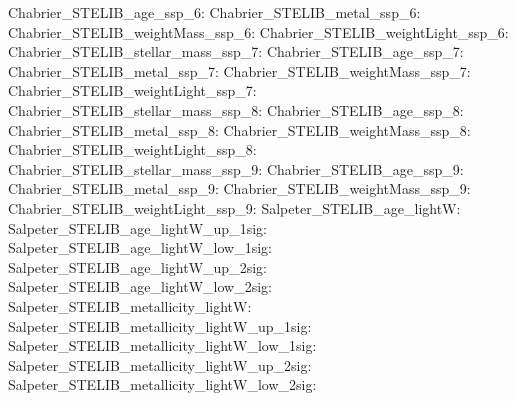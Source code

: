 Chabrier\_STELIB\_age\_ssp\_6:  \newline 
Chabrier\_STELIB\_metal\_ssp\_6:  \newline 
Chabrier\_STELIB\_weightMass\_ssp\_6:  \newline 
Chabrier\_STELIB\_weightLight\_ssp\_6:  \newline 
Chabrier\_STELIB\_stellar\_mass\_ssp\_7:  \newline 
Chabrier\_STELIB\_age\_ssp\_7:  \newline 
Chabrier\_STELIB\_metal\_ssp\_7:  \newline 
Chabrier\_STELIB\_weightMass\_ssp\_7:  \newline 
Chabrier\_STELIB\_weightLight\_ssp\_7:  \newline 
Chabrier\_STELIB\_stellar\_mass\_ssp\_8:  \newline 
Chabrier\_STELIB\_age\_ssp\_8:  \newline 
Chabrier\_STELIB\_metal\_ssp\_8:  \newline 
Chabrier\_STELIB\_weightMass\_ssp\_8:  \newline 
Chabrier\_STELIB\_weightLight\_ssp\_8:  \newline 
Chabrier\_STELIB\_stellar\_mass\_ssp\_9:  \newline 
Chabrier\_STELIB\_age\_ssp\_9:  \newline 
Chabrier\_STELIB\_metal\_ssp\_9:  \newline 
Chabrier\_STELIB\_weightMass\_ssp\_9:  \newline 
Chabrier\_STELIB\_weightLight\_ssp\_9:  \newline 
Salpeter\_STELIB\_age\_lightW:  \newline 
Salpeter\_STELIB\_age\_lightW\_up\_1sig:  \newline 
Salpeter\_STELIB\_age\_lightW\_low\_1sig:  \newline 
Salpeter\_STELIB\_age\_lightW\_up\_2sig:  \newline 
Salpeter\_STELIB\_age\_lightW\_low\_2sig:  \newline 
Salpeter\_STELIB\_metallicity\_lightW:  \newline 
Salpeter\_STELIB\_metallicity\_lightW\_up\_1sig:  \newline 
Salpeter\_STELIB\_metallicity\_lightW\_low\_1sig:  \newline 
Salpeter\_STELIB\_metallicity\_lightW\_up\_2sig:  \newline 
Salpeter\_STELIB\_metallicity\_lightW\_low\_2sig:  \newline 
